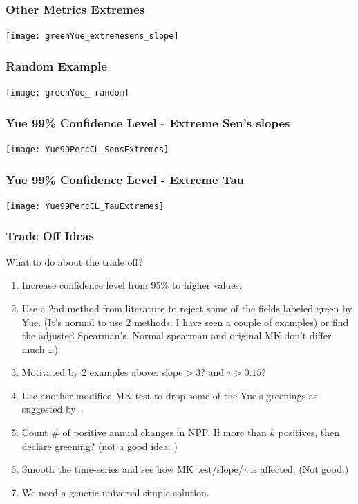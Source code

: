 \documentclass[serif, xcolor={dvipsnames}]{beamer} %
\begin{document}
\begin{frame}
\frametitle{Other Metrics Extremes}
\begin{center}
\texttt{[image: greenYue\_extremesens\_slope]}
\end{center}
\end{frame}
\begin{frame}
\frametitle{Random Example}
\begin{center}
\texttt{[image: greenYue\_ random]}
\end{center}
\end{frame}
\begin{frame}[t]
\frametitle{Yue 99\% Confidence Level - Extreme Sen's slopes}
\begin{center}
\texttt{[image: Yue99PercCL\_SensExtremes]}
\end{center}
\end{frame}
\begin{frame}[t]
\frametitle{Yue 99\% Confidence Level - Extreme Tau}
\begin{center}
\texttt{[image: Yue99PercCL\_TauExtremes]}
\end{center}
\end{frame}

\begin{frame}[t]
\frametitle{Trade Off Ideas}
\vspace{-.15in}
What to do about the trade off? 
\begin{enumerate}
\item Increase confidence level from 95\% to higher values.

\item Use a 2nd method from literature to reject some of the fields labeled green by Yue. 
(It's normal to use 2 methods. I have seen a couple of examples)
or find the adjusted Spearman's. Normal spearman and original MK don't differ much \dots) 

\item Motivated by 2 examples above: slope$ > 3$? and $\tau> 0.15$? 

\item Use another modified MK-test to drop some of the Yue's greenings as suggested by~\cite{blain2013modified}.

\item Count \# of positive annual changes in NPP,
If more than $k$ positives, then declare greening? (not a good idea: )

\item Smooth the time-series and see how MK test/slope/$\tau$ is affected.
(Not good.)

\item We need a generic universal simple solution.
\end{enumerate}
\end{frame}
\end{document}
